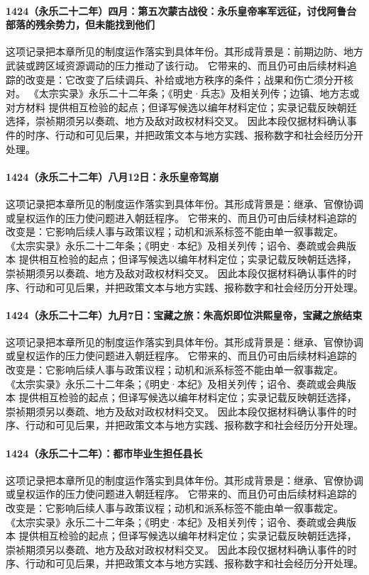 \paragraph{1424（永乐二十二年）四月：第五次蒙古战役：永乐皇帝率军远征，讨伐阿鲁台部落的残余势力，但未能找到他们} 这项记录把本章所见的制度运作落实到具体年份。其形成背景是：前期边防、地方武装或跨区域资源调动的压力推动了该行动。 它带来的、而且仍可由后续材料追踪的改变是：它改变了后续调兵、补给或地方秩序的条件；战果和伤亡须分开核对。 《太宗实录》永乐二十二年条；《明史·兵志》及相关列传；边镇、地方志或对方材料 提供相互检验的起点；但译写候选以编年材料定位；实录记载反映朝廷选择，崇祯期须另以奏疏、地方及敌对政权材料交叉。 因此本段仅据材料确认事件的时序、行动和可见后果，并把政策文本与地方实践、报称数字和社会经历分开处理。

\paragraph{1424（永乐二十二年）八月12日：永乐皇帝驾崩} 这项记录把本章所见的制度运作落实到具体年份。其形成背景是：继承、官僚协调或皇权运作的压力使问题进入朝廷程序。 它带来的、而且仍可由后续材料追踪的改变是：它影响后续人事与政策议程；动机和派系标签不能由单一叙事裁定。 《太宗实录》永乐二十二年条；《明史·本纪》及相关列传；诏令、奏疏或会典版本 提供相互检验的起点；但译写候选以编年材料定位；实录记载反映朝廷选择，崇祯期须另以奏疏、地方及敌对政权材料交叉。 因此本段仅据材料确认事件的时序、行动和可见后果，并把政策文本与地方实践、报称数字和社会经历分开处理。

\paragraph{1424（永乐二十二年）九月7日：宝藏之旅：朱高炽即位洪熙皇帝，宝藏之旅结束} 这项记录把本章所见的制度运作落实到具体年份。其形成背景是：继承、官僚协调或皇权运作的压力使问题进入朝廷程序。 它带来的、而且仍可由后续材料追踪的改变是：它影响后续人事与政策议程；动机和派系标签不能由单一叙事裁定。 《太宗实录》永乐二十二年条；《明史·本纪》及相关列传；诏令、奏疏或会典版本 提供相互检验的起点；但译写候选以编年材料定位；实录记载反映朝廷选择，崇祯期须另以奏疏、地方及敌对政权材料交叉。 因此本段仅据材料确认事件的时序、行动和可见后果，并把政策文本与地方实践、报称数字和社会经历分开处理。

\paragraph{1424（永乐二十二年）：都市毕业生担任县长} 这项记录把本章所见的制度运作落实到具体年份。其形成背景是：继承、官僚协调或皇权运作的压力使问题进入朝廷程序。 它带来的、而且仍可由后续材料追踪的改变是：它影响后续人事与政策议程；动机和派系标签不能由单一叙事裁定。 《太宗实录》永乐二十二年条；《明史·本纪》及相关列传；诏令、奏疏或会典版本 提供相互检验的起点；但译写候选以编年材料定位；实录记载反映朝廷选择，崇祯期须另以奏疏、地方及敌对政权材料交叉。 因此本段仅据材料确认事件的时序、行动和可见后果，并把政策文本与地方实践、报称数字和社会经历分开处理。

